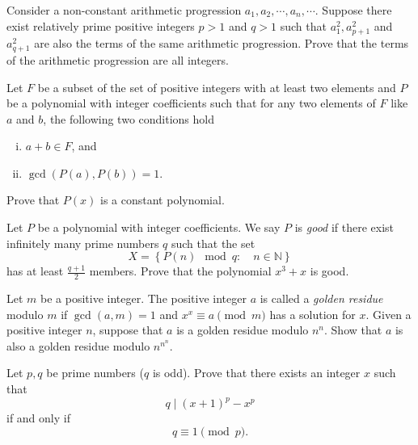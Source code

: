 \documentclass[problems.tex]{subfile}
\begin{document}
	\begin{problem}
		Consider a non-constant arithmetic progression $a_1, a_2,\cdots, a_n,\cdots$. Suppose there exist relatively prime positive integers $p>1$ and $q>1$ such that $a_1^2, a_{p+1}^2$ and $a_{q+1}^2$ are also the terms of the same arithmetic progression. Prove that the terms of the arithmetic progression are all integers. %
	\end{problem}

	\begin{problem}
		Let $F$ be a subset of the set of positive integers with at least two elements and $P$ be a polynomial with integer coefficients such that for any two elements of $F$ like $a$ and $b$, the following two conditions hold
		\begin{enumerate}[(i)]
			\item $a+b \in F$, and
			\item $\gcd(P(a),P(b))=1$.
		\end{enumerate}
		Prove that $P(x)$ is a constant polynomial. %
	\end{problem}

	\begin{problem}
		Let $P$ be a polynomial with integer coefficients. We say $P$ is \textit{good} if there exist infinitely many prime numbers $q$ such that the set $$X=\left\{P(n) \mod q : \quad n\in \mathbb N\right\}$$
		has at least $\frac{q+1}{2}$ members. Prove that the polynomial $x^3+x$ is good. %
	\end{problem}

	\begin{problem}
		Let $m$ be a positive integer. The positive integer $a$ is called a \textit{golden residue} modulo $m$ if $\gcd(a,m)=1$ and $x^x \equiv a \pmod m$ has a solution for $x$. Given a positive integer $n$, suppose that $a$ is a golden residue modulo $n^n$. Show that $a$ is also a golden residue modulo $n^{n^n}$. %
	\end{problem}

	\begin{problem}
		Let $p,q$ be prime numbers ($q$ is odd). Prove that there exists an integer $x$ such that
		$$q \mid (x+1)^p-x^p$$
		if and only if $$q \equiv 1 \pmod p.$$
	\end{problem}
\end{document}
